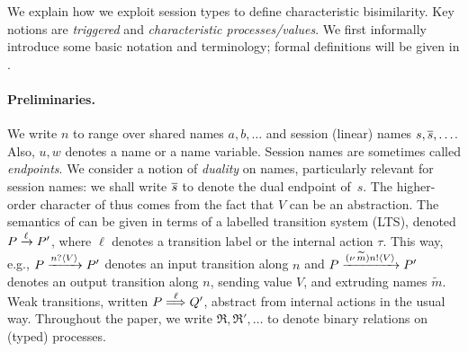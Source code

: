 

We explain how we exploit session types to 
define characteristic bisimilarity.
Key notions are \emph{triggered} and \emph{characteristic processes/values}.
We first informally introduce some basic notation and terminology; formal definitions will be given in .


\paragraph{Preliminaries.}
We write $n$ to range over shared names $a,b,\ldots$ and session (linear) names $s, \overline{s}, \ldots$.
Also, $u, w$ denotes a name or a name variable.
Session names are sometimes called \emph{endpoints}. 
We consider a notion of \emph{duality} on names, particularly relevant for session names:
we shall write 
  $\overline{s}$ to denote the {dual} endpoint of~$s$.
The higher-order character of \HOp thus comes from the fact that $V$ can be an abstraction.
The semantics of \HOp can be given in terms of a labelled transition system (LTS),
denoted $P \xrightarrow{\ell} P'$, where $\ell$ denotes a transition label or the internal action $\tau$.
This way, e.g., 
$P \xrightarrow{n ? \langle V \rangle} P'$ denotes an input transition along $n$
and
$P \xrightarrow{(\nu\, \widetilde{m}) n ! \langle V \rangle} P'$
denotes an output transition along $n$, 
sending value $V$, and extruding names $\widetilde{m}$. 
Weak transitions, written 
$P \stackrel{\ell}{\Longrightarrow} Q'$, abstract from internal actions in the usual way.
Throughout the paper, we write $\Re, \Re',\ldots$ to denote binary relations on (typed) processes.

